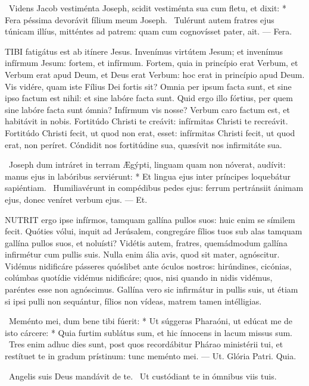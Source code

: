\R\ Videns Jacob vestiménta Joseph, scidit vestiménta sua cum fletu, et dixit: * Fera péssima devorávit fílium meum Joseph. \V\ Tulérunt autem fratres ejus túnicam illíus, mitténtes ad patrem: quam cum cognovísset pater, ait. --- Fera.


\lettrine[lines=2]{T}{IBI} fatigátus est ab itínere Jesus. Invenímus virtútem Jesum; et invenímus infírmum Jesum: fortem, et infírmum. Fortem, quia in princípio erat Verbum, et Verbum erat apud Deum, et Deus erat Verbum: hoc erat in princípio apud Deum. Vis vidére, quam iste Fílius Dei fortis sit? Omnia per ipsum facta sunt, et sine ipso factum est nihil: et sine labóre facta sunt. Quid ergo illo fórtius, per quem sine labóre facta sunt ómnia? Infírmum vis nosse? Verbum caro factum est, et habitávit in nobis. Fortitúdo Christi te creávit: infírmitas Christi te recreávit. Fortitúdo Christi fecit, ut quod non erat, esset: infírmitas Christi fecit, ut quod erat, non períret. Cóndidit nos fortitúdine sua, quæsívit nos infirmitáte sua.

\R\ Joseph dum intráret in terram Ægýpti, linguam quam non nóverat, audívit: manus ejus in labóribus serviérunt: * Et lingua ejus inter príncipes loquebátur sapiéntiam. \V\ Humiliavérunt in compédibus pedes ejus: ferrum pertránsiit ánimam ejus, donec veníret verbum ejus. --- Et.


\lettrine[lines=2]{N}{UTRIT} ergo ipse infírmos, tamquam gallína pullos suos: huic enim se símilem fecit. Quóties vólui, inquit ad Jerúsalem, congregáre fílios tuos sub alas tamquam gallína pullos suos, et noluísti? Vidétis autem, fratres, quemádmodum gallína infirmétur cum pullis suis. Nulla enim ália avis, quod sit mater, agnóscitur. Vidémus nidificáre pásseres quóslibet ante óculos nostros: hirúndines, cicónias, colúmbas quotídie vidémus nidificáre; quos, nisi quando in nidis vidémus, paréntes esse non agnóscimus. Gallína vero sic infirmátur in pullis suis, ut étiam si ipsi pulli non sequántur, fílios non vídeas, matrem tamen intélligias.

\R\ Meménto mei, dum bene tibi fúerit: * Ut súggeras Pharaóni, ut edúcat me de isto cárcere: * Quia furtim sublátus sum, et hic ínnocens in lacum missus sum. \V\ Tres enim adhuc dies sunt, post quos recordábitur Phárao ministérii tui, et restítuet te in gradum prístinum: tunc meménto mei. --- Ut. Glória Patri. Quia.

\V\ Angelis suis Deus mandávit de te. \R\ Ut custódiant te in ómnibus viis tuis.

